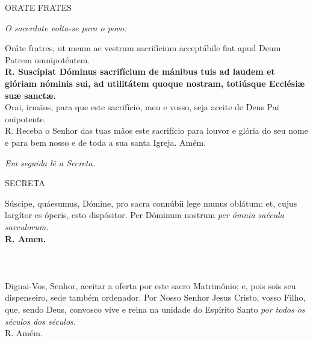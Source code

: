 \begin{center}
	ORATE FRATES
\end{center}

\begin{flushleft}
\textit{O sacerdote volta-se para o povo:}
\end{flushleft}

\begin{multicols}{2}
	\noindent Oráte fratres, ut meum ac vestrum sacrifícium acceptábile fiat apud Deum Patrem omnipoténtem.
	\\ \textbf{R. Suscípiat Dóminus sacrifícium de mánibus tuis  ad laudem et glóriam nóminis sui, ad utilitátem quoque nostram, totiúsque Ecclésiæ suæ sanctæ.}
	\\ Orai, irmãos, para que este sacrifício, meu e vosso, seja aceite de Deus Pai onipotente. 
	\\ R. Receba o Senhor das tuas mãos este sacrifício para louvor e glória do seu nome e para bem nosso e de toda a sua santa Igreja.
	Amém.
\end{multicols}

\begin{flushleft}
	\textit{Em seguida lê a Secreta. }
\end{flushleft}
\begin{center}
	SECRETA
\end{center}

\begin{multicols}{2}
	\noindent Súscipe, quáesumus, Dómine, pro sacra connúbii lege munus oblátum: et, cujus largítor es óperis, esto dispósitor. Per Dóminum nostrum\textit{ per ómnia saécula saeculorum.}
	\\ \textbf{R. Amen.}
	\\
	\\
	\\
	\\ Dignai-Vos, Senhor, aceitar a oferta por este sacro Matrimônio; e, pois sois seu dispenseiro, sede também ordenador. Por Nosso Senhor Jesus Cristo, vosso Filho, que, sendo Deus, convosco vive e reina na unidade do Espírito Santo  \textit{por todos os séculos dos séculos. }
	\\ R. Amém.
\end{multicols}

